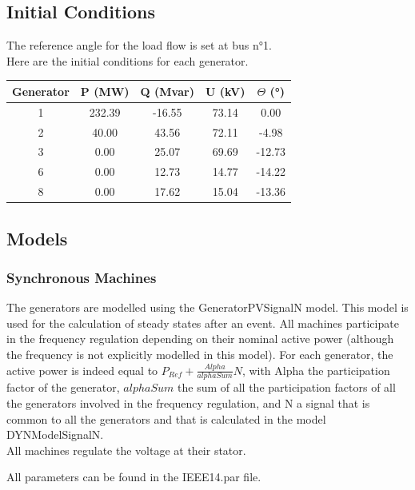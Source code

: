 \documentclass[a4paper, 12pt]{report}
\begin{document}
\subsection{Initial Conditions}

The reference angle for the load flow is set at bus n°1. \\

Here are the initial conditions for each generator.

\begin{center}
\begin{tabular}{|c|c|c|c|c|}
  \hline
  Generator & P (MW) & Q (Mvar) & U (kV) & $\Theta$ (°) \\
  \hline
  1 & 232.39 & -16.55 & 73.14 & 0.00\\
  2 & 40.00 & 43.56 & 72.11 & -4.98\\
  3 & 0.00 & 25.07 & 69.69 & -12.73\\
  6 & 0.00 & 12.73 & 14.77 & -14.22\\
  8 & 0.00 & 17.62 & 15.04 & -13.36\\
  \hline
\end{tabular}
\end{center}

\subsection{Models}

\subsubsection{Synchronous Machines}

The generators are modelled using the GeneratorPVSignalN model. This model is used for the calculation of steady states after an event. All machines participate in the frequency regulation depending on their nominal active power (although the frequency is not explicitly modelled in this model). For each generator, the active power is indeed equal to $P_{Ref} + \frac{Alpha}{alphaSum}N$, with Alpha the participation factor of the generator, $alphaSum$ the sum of all the participation factors of all the generators involved in the frequency regulation, and N a signal that is common to all the generators and that is calculated in the model DYNModelSignalN. \\
All machines regulate the voltage at their stator.

All parameters can be found in the IEEE14.par file.
\end{document}
